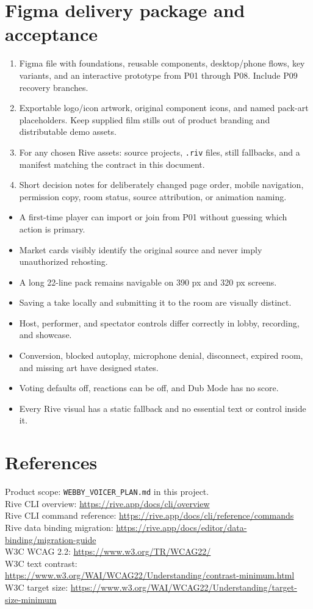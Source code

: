 \documentclass[10pt,a4paper]{article}
\newcommand{\kicker}[1]{\vspace{5pt}{\small\bfseries\color{teal}#1}\par\vspace{2pt}}
\begin{document}
\section{Figma delivery package and acceptance}
\kicker{Deliverables}
\begin{enumerate}
\item Figma file with foundations, reusable components, desktop/phone flows, key variants, and an interactive prototype from P01 through P08. Include P09 recovery branches.
\item Exportable logo/icon artwork, original component icons, and named pack-art placeholders. Keep supplied film stills out of product branding and distributable demo assets.
\item For any chosen Rive assets: source projects, \texttt{.riv} files, still fallbacks, and a manifest matching the contract in this document.
\item Short decision notes for deliberately changed page order, mobile navigation, permission copy, room status, source attribution, or animation naming.
\end{enumerate}
\kicker{Design review checklist}
\begin{itemize}
\item A first-time player can import or join from P01 without guessing which action is primary.
\item Market cards visibly identify the original source and never imply unauthorized rehosting.
\item A long 22-line pack remains navigable on 390 px and 320 px screens.
\item Saving a take locally and submitting it to the room are visually distinct.
\item Host, performer, and spectator controls differ correctly in lobby, recording, and showcase.
\item Conversion, blocked autoplay, microphone denial, disconnect, expired room, and missing art have designed states.
\item Voting defaults off, reactions can be off, and Dub Mode has no score.
\item Every Rive visual has a static fallback and no essential text or control inside it.
\end{itemize}

\section*{References}
\small
Product scope: \texttt{WEBBY\_VOICER\_PLAN.md} in this project.\\
Rive CLI overview: \url{https://rive.app/docs/cli/overview}\\
Rive CLI command reference: \url{https://rive.app/docs/cli/reference/commands}\\
Rive data binding migration: \url{https://rive.app/docs/editor/data-binding/migration-guide}\\
W3C WCAG 2.2: \url{https://www.w3.org/TR/WCAG22/}\\
W3C text contrast: \url{https://www.w3.org/WAI/WCAG22/Understanding/contrast-minimum.html}\\
W3C target size: \url{https://www.w3.org/WAI/WCAG22/Understanding/target-size-minimum}
\end{document}
